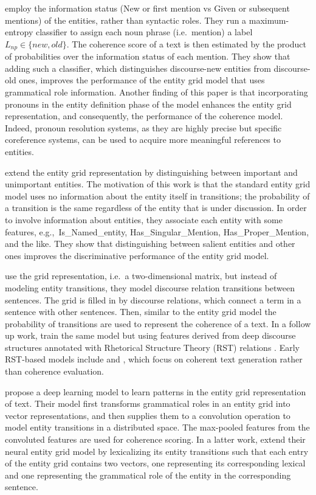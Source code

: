  employ the information status (New or first mention vs Given or subsequent mentions) of the entities, rather than syntactic roles. 
They run a maximum-entropy classifier to assign each noun phrase (i.e.\ mention) a label $L_{np} \in \lbrace new, old \rbrace$. 
The coherence score of a text is then estimated by the product of probabilities over the information status of each mention. 
They show that adding such a classifier, which distinguishes discourse-new entities from discourse-old ones, improves the performance of the entity grid model that uses grammatical role information.  
Another finding of this paper is that incorporating pronouns in the entity definition phase of the model enhances the entity grid representation, and consequently, the performance of the coherence model. 
Indeed, pronoun resolution systems, as they are highly precise but specific coreference systems, can be used to acquire more meaningful references to entities. 

 extend the entity grid representation by distinguishing between important and unimportant entities. 
The motivation of this work is that the standard entity grid model uses no information about the entity itself in transitions; the probability of a transition is the same regardless of the entity that is under discussion. 
In order to involve information about entities, they associate each entity with some features, e.g.,\ Is\_Named\_entity, Has\_Singular\_Mention, Has\_Proper\_Mention, and the like. 
They show that distinguishing between salient entities and other ones improves the discriminative performance of the entity grid model. 

 use the grid representation, i.e.\ a two-dimensional matrix, but instead of modeling entity transitions, they model discourse relation transitions between sentences. 
The grid is filled in by discourse relations, which connect a term in a sentence with other sentences. 
Then, similar to the entity grid model the probability of transitions are used to represent the coherence of a text. 
In a follow up work,  train the same model but using features derived from deep discourse structures annotated with Rhetorical Structure Theory (RST) relations \cite{mann88,prasad08a}. 
Early RST-based models include  and , which focus on coherent text generation rather than coherence evaluation.

 propose a deep learning model to learn patterns in the entity grid representation of text. 
Their model first transforms grammatical roles in an entity grid into vector representations, and then supplies them to a convolution operation to model entity transitions in a distributed space. 
The max-pooled features from the convoluted features are used for coherence scoring. 
In a latter work,  extend their neural entity grid model by lexicalizing its entity transitions such that each entry of the entity grid contains two vectors, one representing its corresponding lexical and one representing the grammatical role of the entity in the corresponding sentence.  

